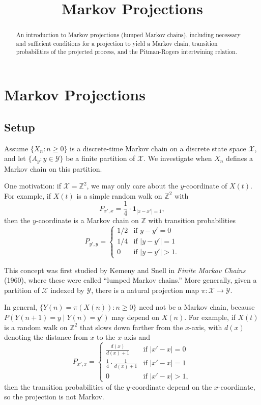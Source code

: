 \documentclass{ximera}
\title{Markov Projections}
\begin{document}
\begin{abstract}
An introduction to Markov projections (lumped Markov chains), including necessary and sufficient conditions for a projection to yield a Markov chain, transition probabilities of the projected process, and the Pitman-Rogers intertwining relation.
\end{abstract}
\maketitle

\section*{Markov Projections}

\subsection*{Setup}

Assume $\{X_n : n \geq 0\}$ is a discrete-time Markov chain on a discrete state space $\mathcal{X}$, and let $\{A_y : y \in \mathcal{Y}\}$ be a finite partition of $\mathcal{X}$. We investigate when $X_n$ defines a Markov chain on this partition.

One motivation: if $\mathcal{X} = \mathbb{Z}^2$, we may only care about the $y$-coordinate of $X(t)$. For example, if $X(t)$ is a simple random walk on $\mathbb{Z}^2$ with
\[
P_{x',x} = \frac{1}{4} \cdot \mathbf{1}_{|x - x'| = 1},
\]
then the $y$-coordinate is a Markov chain on $\mathbb{Z}$ with transition probabilities
\[
P_{y',y} = \begin{cases} 1/2 & \text{if } y - y' = 0 \\ 1/4 & \text{if } |y - y'| = 1 \\ 0 & \text{if } |y - y'| > 1. \end{cases}
\]

This concept was first studied by Kemeny and Snell in \textit{Finite Markov Chains} (1960), where these were called ``lumped Markov chains.'' More generally, given a partition of $\mathcal{X}$ indexed by $\mathcal{Y}$, there is a natural projection map $\pi : \mathcal{X} \to \mathcal{Y}$.

In general, $\{Y(n) = \pi(X(n)) : n \geq 0\}$ need not be a Markov chain, because $P(Y(n+1) = y \mid Y(n) = y')$ may depend on $X(n)$. For example, if $X(t)$ is a random walk on $\mathbb{Z}^2$ that slows down farther from the $x$-axis, with $d(x)$ denoting the distance from $x$ to the $x$-axis and
\[
P_{x',x} = \begin{cases} \frac{d(x)}{d(x)+1} & \text{if } |x' - x| = 0 \\ \frac{1}{4} \cdot \frac{1}{d(x)+1} & \text{if } |x' - x| = 1 \\ 0 & \text{if } |x' - x| > 1, \end{cases}
\]
then the transition probabilities of the $y$-coordinate depend on the $x$-coordinate, so the projection is not Markov.
\end{document}

